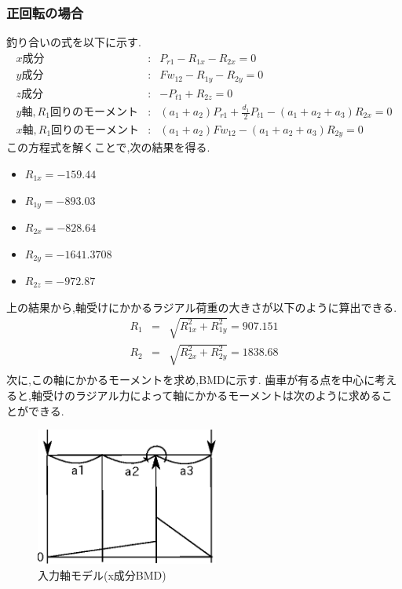 \subsubsection{正回転の場合}
釣り合いの式を以下に示す.
\begin{eqnarray}
x成分&:&P_{r1}-R_{1x}-R_{2x}=0\\
y成分&:&Fw_{12}-R_{1y}-R_{2y}=0\\
z成分&:&-P_{t1}+R_{2z}=0\\
y軸,R_1回りのモーメント&:&(a_1+a_2)P_{r1}+\frac{d_1}{2}P_{t1}-(a_1+a_2+a_3)R_{2x}=0\\
x軸,R_1回りのモーメント&:&(a_1+a_2)Fw_{12}-(a_1+a_2+a_3)R_{2y}=0
\end{eqnarray}
この方程式を解くことで,次の結果を得る.


\begin{itemize}
\item $R_{1x}=-159.44$
\item $R_{1y}=-893.03$
\item $R_{2x}=-828.64$
\item $R_{2y}=-1641.3708$
\item $R_{2z}=-972.87$
\end{itemize}
上の結果から,軸受けにかかるラジアル荷重の大きさが以下のように算出できる.
\begin{eqnarray}
R_1 &=& \sqrt {R_{1x}^2+R_{1y}^2}=907.151\\
R_2 &=& \sqrt {R_{2x}^2+R_{2y}^2}=1838.68\\
\end{eqnarray}
次に,この軸にかかるモーメントを求め,BMDに示す.
歯車が有る点を中心に考えると,軸受けのラジアル力によって軸にかかるモーメントは次のように求めることができる.
\begin{figure}[htbp]
\begin{center}
\includegraphics[width=6cm]{../pictures/onecwx.eps}
\end{center}
\caption{入力軸モデル(x成分BMD)}
\end{figure}



